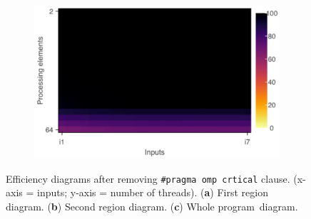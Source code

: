 \begin{figure}[H]
\begin{subfigure}[b]{0.45\textwidth}
	\end{subfigure}
	\begin{subfigure}[b]{0.45\textwidth}
		\includegraphics[width=\textwidth]{pascalanalyzer/figures/results/efficiency_rg_3.pdf}
		\caption{\centering}
		\label{fig:pv_regionscomparison_c_2}
	\end{subfigure}
	\caption{Efficiency diagrams after removing {\tt \#pragma~omp~crtical} clause. (x-axis = inputs; y-axis = number of threads). (\textbf{a}) First region diagram. (\textbf{b}) Second region diagram. (\textbf{c}) Whole program~diagram.}
	\label{fig:pv_regionscomparison_2}
\end{figure}
\unskip
